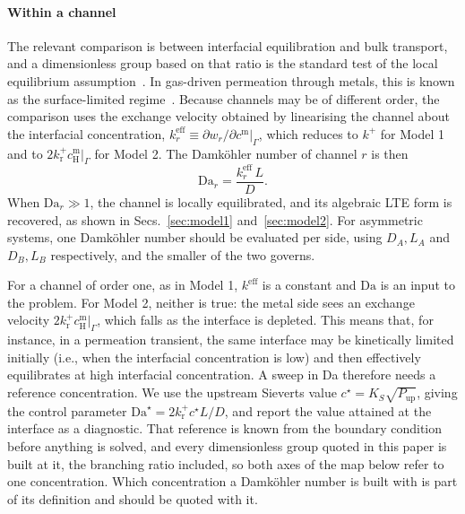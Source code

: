 \documentclass[5p]{elsarticle}
\newcommand{\Da}{\mathrm{Da}}
\newcommand{\cm}[1]{c^{\mathrm{m}}_{#1}}   %
\begin{document}
\paragraph{Within a channel} 
The relevant comparison is between interfacial equilibration and bulk transport, and a dimensionless group based on that ratio is the standard test of the local equilibrium assumption~\cite{knapp_spatial_1989}.
In gas-driven permeation through metals, this is known as the surface-limited regime~\cite{pisarev_gas-driven_2003, denisov_surface-limited_2018}.
Because channels may be of different order, the comparison uses the exchange velocity obtained by linearising the channel about the interfacial concentration, $k_r^\mathrm{eff} \equiv \partial w_r / \partial \cm{}\big|_\Gamma$, which reduces to $k^{+}$ for Model 1 and to $2 k_\mathrm{r}^{+} \cm{\mathrm{H}}|_\Gamma$ for Model 2.
The Damk\"ohler number of channel $r$ is then
\begin{equation}
    \Da_r = \frac{k_r^\mathrm{eff}\,L}{D} .
    \label{eq:damkohler}
\end{equation}
When $\Da_r \gg 1$, the channel is locally equilibrated, and its algebraic LTE form is recovered, as shown in Secs.~\ref{sec:model1} and~\ref{sec:model2}. 
For asymmetric systems, one Damk\"ohler number should be evaluated per side, using $D_A, L_A$ and $D_B, L_B$ respectively, and the smaller of the two governs.

For a channel of order one, as in Model 1, $k^\mathrm{eff}$ is a constant and $\Da$ is an input to the problem.
For Model 2, neither is true: the metal side sees an exchange velocity $2k_\mathrm{r}^{+}\cm{\mathrm{H}}|_\Gamma$, which falls as the interface is depleted.
This means that, for instance, in a permeation transient, the same interface may be kinetically limited initially (i.e., when the interfacial concentration is low) and then effectively equilibrates at high interfacial concentration.
A sweep in Da therefore needs a reference concentration.
We use the upstream Sieverts value $c^{\star} = K_S\sqrt{P_\mathrm{up}}$, giving the control parameter $\Da^{\star} = 2k_\mathrm{r}^{+}c^{\star}L/D$, and report the value attained at the interface as a diagnostic.
That reference is known from the boundary condition before anything is solved, and every dimensionless group quoted in this paper is built at it, the branching ratio included, so both axes of the map below refer to one concentration.
Which concentration a Damk\"ohler number is built with is part of its definition and should be quoted with it.
\end{document}
